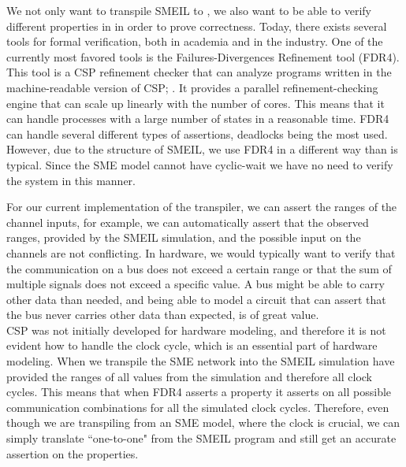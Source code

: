 We not only want to transpile SMEIL to \cspm{}, we also want to be able to verify different properties in \cspm{} in order to prove correctness. Today, there exists several tools for formal verification, both in academia and in the industry. One of the currently most favored tools is the Failures-Divergences Refinement tool (FDR4). This tool is a CSP refinement checker that can analyze programs written in the machine-readable version of CSP; \cspm{}.
It provides a parallel refinement-checking engine that can scale up linearly with the number of cores. This means that it can handle processes with a large number of states in a reasonable time. FDR4 can handle several different types of assertions, deadlocks being the most used. However, due to the structure of SMEIL, we use FDR4 in a different way than is typical. Since the SME model cannot have cyclic-wait we have no need to verify the system in this manner.

For our current implementation of the transpiler, we can assert the ranges of the channel inputs, for example, we can automatically assert that the observed ranges, provided by the SMEIL simulation, and the possible input on the \cspm{} channels are not conflicting.
In hardware, we would typically want to verify that the communication on a bus does not exceed a certain range or that the sum of multiple signals does not exceed a specific value. A bus might be able to carry other data than needed, and being able to model a circuit that can assert that the bus never carries other data than expected, is of great value.
\\

CSP was not initially developed for hardware modeling, and therefore it is not evident how to handle the clock cycle, which is an essential part of hardware modeling. When we transpile the SME network into \cspm{} the SMEIL simulation have provided the ranges of all values from the simulation and therefore all clock cycles. This means that when FDR4 asserts a property it asserts on all possible communication combinations for all the simulated clock cycles. Therefore, even though we are transpiling from an SME model, where the clock is crucial, we can simply translate ``one-to-one" from the SMEIL program and still get an accurate assertion on the properties.

